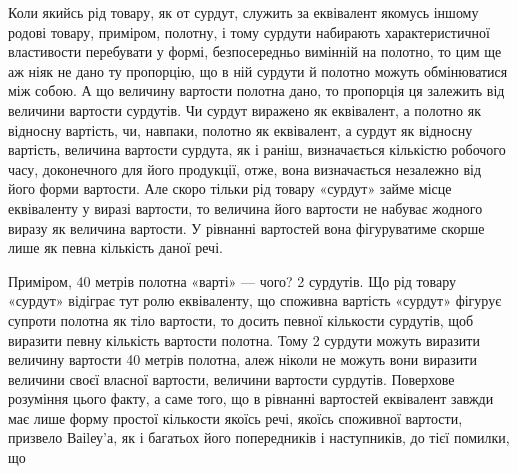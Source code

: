 Коли якийсь рід товару, як от сурдут, служить за еквівалент якомусь іншому родові товару, приміром,
полотну, і тому сурдути набирають характеристичної властивости перебувати у формі, безпосередньо
вимінній на полотно, то цим ще аж ніяк не дано ту пропорцію, що в ній сурдути й полотно можуть
обмінюватися між собою. А що величину вартости полотна дано, то пропорція ця залежить від величини
вартости сурдутів. Чи сурдут виражено як еквівалент, а полотно як відносну вартість, чи, навпаки,
полотно як еквівалент, а сурдут як відносну вартість, величина вартости сурдута, як і раніш,
визначається кількістю робочого часу, доконечного для його продукції, отже, вона  визначається
незалежно від його форми вартости. Але скоро тільки рід товару «сурдут» займе місце еквіваленту у
виразі вартости, то величина його вартости не набуває жодного виразу як величина вартости. У
рівнанні вартостей вона фігуруватиме скорше лише як певна кількість даної речі.

Приміром, 40 метрів полотна «варті» — чого? 2 сурдутів. Що рід товару «сурдут» відіграє тут ролю
еквіваленту, що споживна вартість «сурдут» фігурує супроти полотна як тіло вартости, то досить
певної кількости сурдутів, щоб виразити певну кількість вартости полотна. Тому 2 сурдути можуть
виразити величину вартости 40 метрів полотна, алеж ніколи не можуть вони виразити величини своєї
власної вартости, величини вартости сурдутів. Поверхове розуміння цього факту, а саме того, що в
рівнанні вартостей еквівалент завжди має лише форму простої кількости якоїсь речі, якоїсь споживної
вартости, призвело Ваіlеу’а, як і багатьох його попередників і наступників, до тієї помилки, що
\parbreak{}  %

